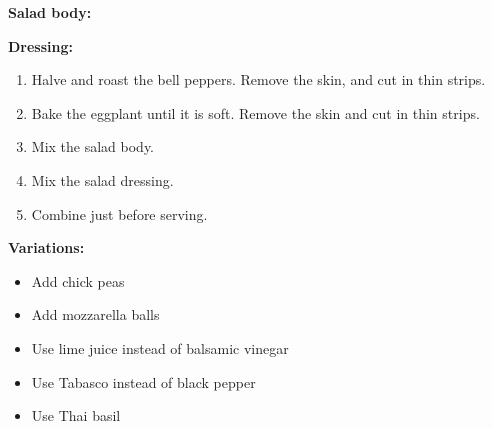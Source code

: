 \prep{}

\textbf{Salad body:}

\begin{ingredients}
\end{ingredients}

\textbf{Dressing:}

\begin{ingredients}
  \ingr{}{}{}
\end{ingredients}


\begin{recipe}
  \begin{enumerate}

  \item Halve and roast the bell peppers.  Remove the skin, and cut in
    thin strips.

  \item Bake the eggplant until it is soft.  Remove the skin and cut
    in thin strips.

  \item Mix the salad body.

  \item Mix the salad dressing.

  \item Combine just before serving.

  \end{enumerate}

  \textbf{Variations:}
  \begin{itemize}
  \item Add chick peas
  \item Add mozzarella balls
  \item Use lime juice instead of balsamic vinegar
  \item Use Tabasco instead of black pepper
  \item Use Thai basil
  \end{itemize}
\end{recipe}
